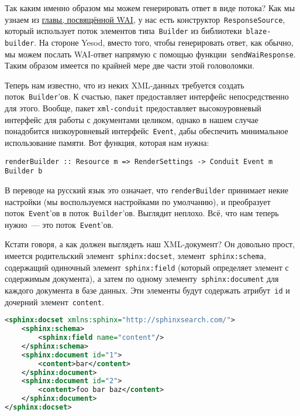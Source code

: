 Так каким именно образом мы можем генерировать ответ в виде потока?
Как мы узнаем из \hyperref[chap:web_application_interface]{главы, посвящённой WAI}, у нас есть конструктор~\lstinline!ResponseSource!, который использует поток элементов типа~\lstinline!Builder! из библиотеки~\lstinline'blaze-builder'. На стороне Yesod, вместо того, чтобы генерировать ответ, как обычно, мы можем послать WAI-ответ напрямую с помощью функции~\lstinline'sendWaiResponse'. Таким образом имеется по крайней мере две части этой головоломки.

Теперь нам известно, что из неких XML-данных требуется создать поток~\lstinline!Builder!'ов. К счастью, пакет  предоставляет интерфейс непосредственно для этого. Вообще, пакет \texttt{xml-conduit} предоставляет высокоуровневый интерфейс для работы с документами целиком, однако в нашем случае понадобится низкоуровневый интерфейс~\lstinline'Event', дабы обеспечить минимальное использование памяти. Вот функция, которая нам нужна:
\begin{lstlisting}
renderBuilder :: Resource m => RenderSettings -> Conduit Event m Builder b
\end{lstlisting}

В переводе на русский язык это означает, что \lstinline'renderBuilder' принимает некие настройки (мы воспользуемся настройками по умолчанию), и преобразует поток~\lstinline!Event!'ов в поток~\lstinline!Builder!'ов. Выглядит неплохо. Всё, что нам теперь нужно~--- это поток~\lstinline!Event!'ов.

Кстати говоря, а как должен выглядеть наш XML-документ? Он довольно прост, имеется родительский элемент~\lstinline'sphinx:docset', элемент~\lstinline'sphinx:schema', содержащий одиночный элемент~\lstinline'sphinx:field' (который определяет элемент с содержимым документа), а затем по одному элементу~\lstinline'sphinx:document' для каждого документа в базе данных. Эти элементы будут содержать атрибут~\lstinline'id' и дочерний элемент~\lstinline'content'.
\begin{lstlisting}[language=XML,caption=Пример xmlpipe-документа]
<sphinx:docset xmlns:sphinx="http://sphinxsearch.com/">
    <sphinx:schema>
        <sphinx:field name="content"/>
    </sphinx:schema>
    <sphinx:document id="1">
        <content>bar</content>
    </sphinx:document>
    <sphinx:document id="2">
        <content>foo bar baz</content>
    </sphinx:document>
</sphinx:docset>
\end{lstlisting}

